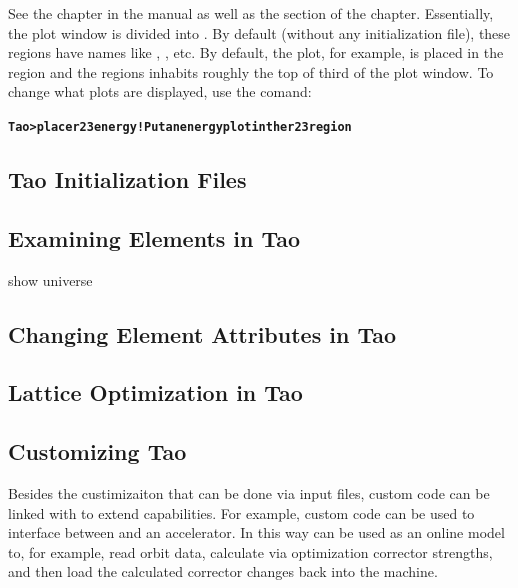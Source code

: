 \documentclass{hitec}
\newcommand{\BF}[1]{{\normalfont\textbf{#1}}}
\begin{document}
See the  chapter in the \tao manual as well as the  section of the  chapter. Essentially, the plot window is
divided into . By default (without any initialization file), these regions
have names like , , etc. By default, the  plot, for example, is
placed in the  region and the  regions inhabits roughly the top of third
of the plot window. To change what plots are displayed, use the  comand:
\begin{alltt}
  \BF{Tao> place r23 energy  ! Put an energy plot in the r23 region}
\end{alltt}

\subsection{Tao Initialization Files}



\subsection{Examining Elements in Tao}

show universe

\subsection{Changing Element Attributes in Tao}

\subsection{Lattice Optimization in Tao}


\subsection{Customizing Tao}

Besides the custimizaiton that can be done via \tao input files, \tao custom code
can be linked with \tao to extend \tao capabilities. For example, custom code can
be used to interface between \tao and an accelerator. In this way \tao can be used
as an online model to, for example, read orbit data, calculate via optimization corrector
strengths, and then load the calculated corrector changes back into the machine.
\end{document}
